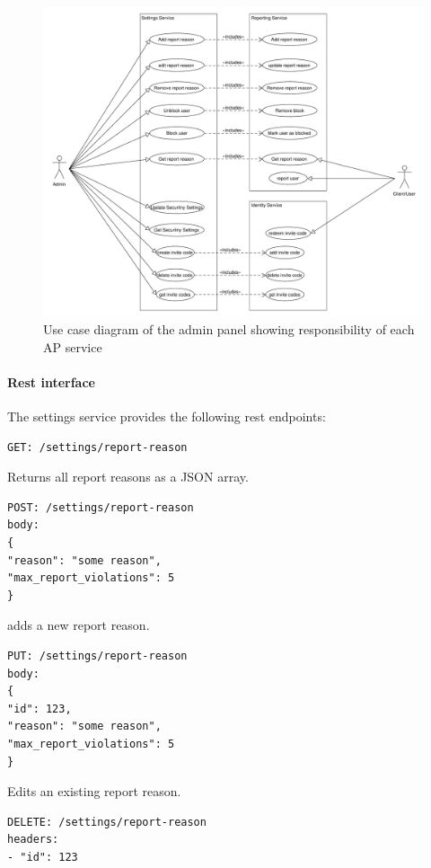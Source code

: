 \begin{figure}[!ht]
    \centering
    \includegraphics[width=1.0\textwidth]{./images/UseCaseDiagramAdminPanel.pdf}
    \caption{Use case diagram of the admin panel showing responsibility of each AP service}
    \label{fig:ucd}
\end{figure}

\paragraph{Rest interface}
The settings service provides the following rest endpoints:

\begin{verbatim}
GET: /settings/report-reason
\end{verbatim}

Returns all report reasons as a JSON array.

\begin{verbatim}
POST: /settings/report-reason
body:
{
"reason": "some reason",
"max_report_violations": 5
}
\end{verbatim}
adds a new report reason.

\begin{verbatim}
PUT: /settings/report-reason
body:
{
"id": 123,
"reason": "some reason",
"max_report_violations": 5
}
\end{verbatim}
Edits an existing report reason.


\begin{verbatim}
DELETE: /settings/report-reason
headers:
- "id": 123
\end{verbatim}


